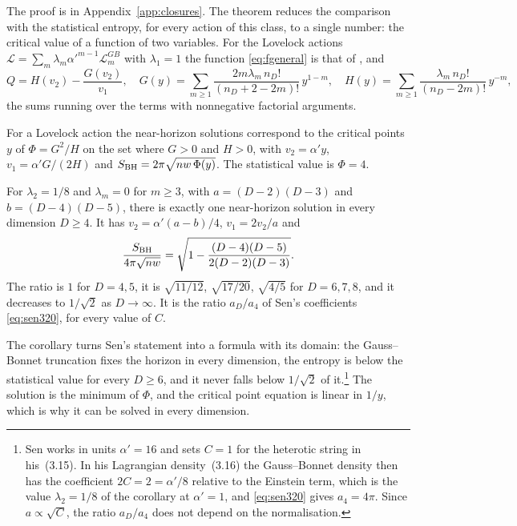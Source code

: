 The proof is in Appendix~\ref{app:closures}. The theorem reduces the comparison with the statistical entropy, for every action of this class, to a single number: the critical value of a function of two variables. For the Lovelock actions $\mathcal L=\sum_m\lambda_m\alpha'^{m-1}\mathcal L_m^{GB}$ with $\lambda_1=1$ the function \eqref{eq:fgeneral} is that of \cite[Eq.~(4.3)]{Prester06}, and
\begin{equation}\label{eq:GH}
Q=H(v_2)-\frac{G(v_2)}{v_1},\quad G(y)=\sum_{m\ge1}\frac{2m\lambda_m\,n_D!}{(n_D+2-2m)!}\,y^{1-m},\quad H(y)=\sum_{m\ge1}\frac{\lambda_m\,n_D!}{(n_D-2m)!}\,y^{-m},
\end{equation}
the sums running over the terms with nonnegative factorial arguments.

\begin{corollary}\label{cor:lovelock}
For a Lovelock action the near-horizon solutions correspond to the critical points $y$ of $\Phi=G^2/H$ on the set where $G>0$ and $H>0$, with $v_2=\alpha'y$, $v_1=\alpha'G/(2H)$ and $S_{\rm BH}=2\pi\sqrt{nw\,\Phi(y)}$. The statistical value is $\Phi=4$.
\end{corollary}

\begin{corollary}\label{cor:gb}
For $\lambda_2=1/8$ and $\lambda_m=0$ for $m\ge3$, with $a=(D-2)(D-3)$ and $b=(D-4)(D-5)$, there is exactly one near-horizon solution in every dimension $D\ge4$. It has $v_2=\alpha'(a-b)/4$, $v_1=2v_2/a$ and
\begin{equation}\label{eq:gbratio}
\frac{S_{\rm BH}}{4\pi\sqrt{nw}}=\sqrt{1-\frac{(D-4)(D-5)}{2(D-2)(D-3)}}.
\end{equation}
The ratio is $1$ for $D=4,5$, it is $\sqrt{11/12}$, $\sqrt{17/20}$, $\sqrt{4/5}$ for $D=6,7,8$, and it decreases to $1/\sqrt2$ as $D\to\infty$. It is the ratio $a_D/a_4$ of Sen's coefficients \eqref{eq:sen320}, for every value of $C$.
\end{corollary}

The corollary turns Sen's statement into a formula with its domain: the Gauss--Bonnet truncation fixes the horizon in every dimension, the entropy is below the statistical value for every $D\ge6$, and it never falls below $1/\sqrt2$ of it.\footnote{Sen works in units $\alpha'=16$ and sets $C=1$ for the heterotic string in his~(3.15). In his Lagrangian density~(3.16) the Gauss--Bonnet density then has the coefficient $2C=2=\alpha'/8$ relative to the Einstein term, which is the value $\lambda_2=1/8$ of the corollary at $\alpha'=1$, and \eqref{eq:sen320} gives $a_4=4\pi$. Since $a\propto\sqrt C$, the ratio $a_D/a_4$ does not depend on the normalisation.} The solution is the minimum of $\Phi$, and the critical point equation is linear in $1/y$, which is why it can be solved in every dimension.

